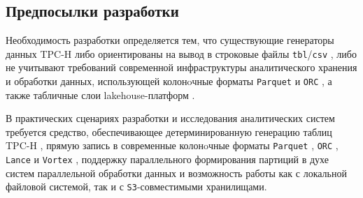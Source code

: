 \subsection{Предпосылки разработки}

Необходимость разработки определяется тем, что существующие генераторы данных
TPC-H  либо ориентированы на вывод в строковые файлы
\texttt{tbl}/\texttt{csv} , либо не учитывают требований современной
инфраструктуры аналитического хранения и обработки данных, использующей
колонoчные форматы \texttt{Parquet}  и \texttt{ORC} , а
также табличные слои lakehouse-платформ .

В практических сценариях разработки и исследования аналитических систем
требуется средство, обеспечивающее детерминированную генерацию таблиц TPC-H
, прямую запись в современные колонoчные форматы \texttt{Parquet}
, \texttt{ORC} , \texttt{Lance}  и
\texttt{Vortex} , поддержку параллельного формирования партиций в
духе систем параллельной обработки данных  и возможность работы как
с локальной файловой системой, так и с \texttt{S3}-совместимыми хранилищами.
